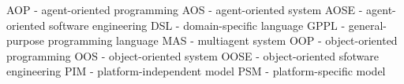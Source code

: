 

AOP - agent-oriented programming
AOS - agent-oriented system
AOSE - agent-oriented software engineering
DSL - domain-specific language
GPPL - general-purpose programming language
MAS - multiagent system
OOP - object-oriented programming
OOS - object-oriented system
OOSE - object-oriented sfotware engineering
PIM - platform-independent model
PSM - platform-specific model